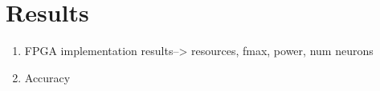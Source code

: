 \section{Results}
\label{sec_results}

\begin{enumerate}
\item FPGA implementation results--> resources, fmax, power, num neurons
\item Accuracy
\end{enumerate}
